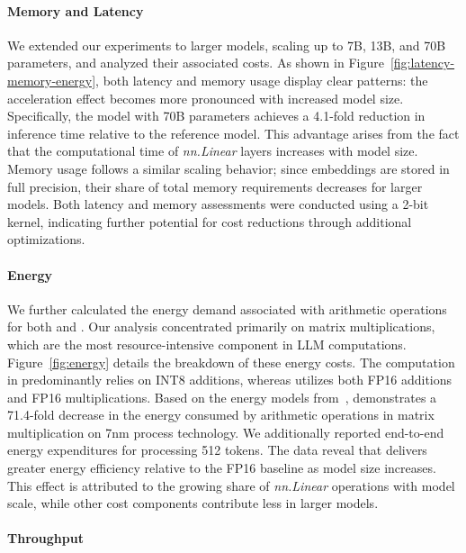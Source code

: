 \paragraph{Memory and Latency}

We extended our experiments to larger models, scaling up to 7B, 13B, and 70B parameters, and analyzed their associated costs. As shown in Figure~\ref{fig:latency-memory-energy}, both latency and memory usage display clear patterns: the acceleration effect becomes more pronounced with increased model size. Specifically, the  model with 70B parameters achieves a 4.1-fold reduction in inference time relative to the  reference model. This advantage arises from the fact that the computational time of \emph{nn.Linear} layers increases with model size. Memory usage follows a similar scaling behavior; since embeddings are stored in full precision, their share of total memory requirements decreases for larger models. Both latency and memory assessments were conducted using a 2-bit kernel, indicating further potential for cost reductions through additional optimizations.

\paragraph{Energy}

We further calculated the energy demand associated with arithmetic operations for both  and . Our analysis concentrated primarily on matrix multiplications, which are the most resource-intensive component in LLM computations. Figure~\ref{fig:energy} details the breakdown of these energy costs. The computation in  predominantly relies on INT8 additions, whereas  utilizes both FP16 additions and FP16 multiplications. Based on the energy models from~\cite{energycost, pokebnn},  demonstrates a 71.4-fold decrease in the energy consumed by arithmetic operations in matrix multiplication on 7nm process technology. We additionally reported end-to-end energy expenditures for processing 512 tokens. The data reveal that  delivers greater energy efficiency relative to the FP16  baseline as model size increases. This effect is attributed to the growing share of \emph{nn.Linear} operations with model scale, while other cost components contribute less in larger models.

\paragraph{Throughput}

